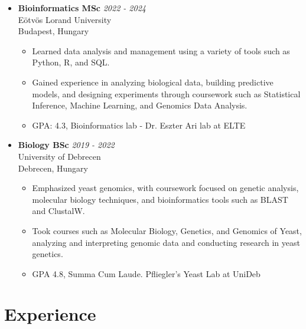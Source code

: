 \documentclass[11pt,a4paper]{article}
\begin{document}
\begin{itemize}

    \item \textbf{Bioinformatics MSc} \hfill \textit{2022 - 2024} \\
    Eötvös Lorand University \\
    Budapest, Hungary \\
    \begin{itemize}
        \item Learned data analysis and management using a variety of tools such as Python, R, and SQL. 

        \item Gained experience in analyzing biological data, building predictive models, and designing experiments through coursework such as Statistical Inference, Machine Learning, and Genomics Data Analysis.
        \item GPA: 4.3, Bioinformatics lab - Dr. Eszter Ari lab at ELTE
    \end{itemize}
    
    \item \textbf{Biology BSc} \hfill \textit{2019 - 2022} \\
    University of Debrecen \\
    Debrecen, Hungary \\
    \begin{itemize}
        \item Emphasized yeast genomics, with coursework focused on genetic analysis, molecular biology techniques, and bioinformatics tools such as BLAST and ClustalW. 
        \item Took courses such as Molecular Biology, Genetics, and Genomics of Yeast, analyzing and interpreting genomic data and conducting research in yeast genetics.
        \item GPA 4.8, Summa Cum Laude. Pfliegler's Yeast Lab at UniDeb
    \end{itemize}

    
\end{itemize}

\section*{Experience}
\end{document}
